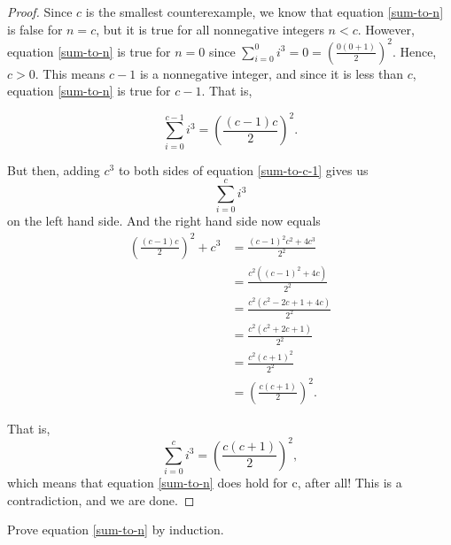 \documentclass[twoside,12pt]{article}
\begin{document}
\begin{problem}{14}
{\begin{proof}
Since $c$ is the smallest counterexample, we know that equation \eqref{sum-to-n} is false for $n = c$, but it is true for all nonnegative integers $n < c$.  However, equation \eqref{sum-to-n} is true for $n = 0$ since $\sum_{i=0}^{0} i^3 = 0 = \left(\frac{0(0+1)}{2}\right)^2$. Hence, $c > 0$. This means $c - 1$ is a nonnegative integer, and since it is less than $c$, equation \eqref{sum-to-n} is true for $c - 1$. That is,

\begin{equation}\label{sum-to-c-1}
\sum_{i=0}^{c-1} i^3 = \left(\frac{(c-1)c}{2}\right)^2.
\end{equation}

But then, adding $c^3$ to both sides of equation \eqref{sum-to-c-1} gives us
\[
\sum_{i=0}^{c} i^3
\]
on the left hand side. And the right hand side now equals
\begin{align*}
\left(\frac{(c-1)c}{2}\right)^2 + c^3 &= \frac{(c-1)^2c^2+4c^3}{2^2}\\
 &= \frac{c^2\left((c-1)^2+4c \right)}{2^2}\\
&= \frac{c^2\left(c^2-2c+1+4c \right)}{2^2}\\
&= \frac{c^2\left(c^2+2c+1 \right)}{2^2}\\
&= \frac{c^2(c+1)^2}{2^2}\\
&= \left(\frac{c(c+1)}{2}\right)^2.
\end{align*}

That is,
\[
\sum_{i=0}^{c} i^3 = \left(\frac{c(c+1)}{2}\right)^2,
\]
which means that equation \ref{sum-to-n} does hold for c, after all! This is a contradiction, and we are done.

\end{proof}
}

Prove equation \eqref{sum-to-n} by induction.

\end{problem}
\end{document}
